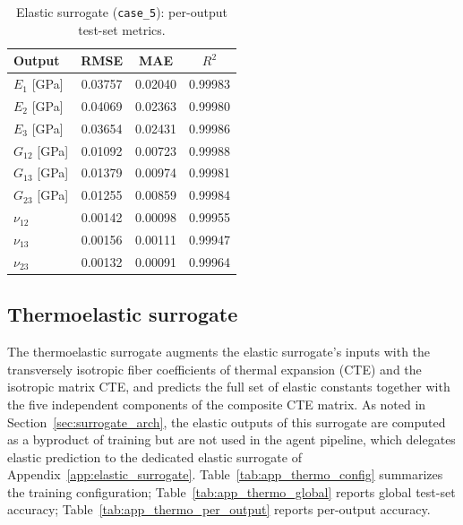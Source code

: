 \documentclass[preprint,review,10pt,number]{elsarticle}
\begin{document}
\begin{table}[h]
\centering
\caption{Elastic surrogate (\texttt{case\_5}): per-output test-set metrics.}
\label{tab:app_elastic_per_output}
\begin{tabular}{lccc}
\toprule
Output & RMSE & MAE & $R^2$ \\
\midrule
$E_1$ [GPa]    & 0.03757 & 0.02040 & 0.99983 \\
$E_2$ [GPa]    & 0.04069 & 0.02363 & 0.99980 \\
$E_3$ [GPa]    & 0.03654 & 0.02431 & 0.99986 \\
$G_{12}$ [GPa] & 0.01092 & 0.00723 & 0.99988 \\
$G_{13}$ [GPa] & 0.01379 & 0.00974 & 0.99981 \\
$G_{23}$ [GPa] & 0.01255 & 0.00859 & 0.99984 \\
$\nu_{12}$     & 0.00142 & 0.00098 & 0.99955 \\
$\nu_{13}$     & 0.00156 & 0.00111 & 0.99947 \\
$\nu_{23}$     & 0.00132 & 0.00091 & 0.99964 \\
\bottomrule
\end{tabular}
\end{table}

\FloatBarrier
\subsection{Thermoelastic surrogate}
\label{app:thermoelastic_surrogate}

The thermoelastic surrogate augments the elastic surrogate's inputs
with the transversely isotropic fiber coefficients of thermal
expansion (CTE) and the isotropic matrix CTE, and predicts the full
set of elastic constants together with the five independent
components of the composite CTE matrix. As noted in
Section~\ref{sec:surrogate_arch}, the elastic outputs of this
surrogate are computed as a byproduct of training but are not used in
the agent pipeline, which delegates elastic prediction to the
dedicated elastic surrogate of Appendix~\ref{app:elastic_surrogate}.
Table~\ref{tab:app_thermo_config} summarizes the training
configuration; Table~\ref{tab:app_thermo_global} reports global
test-set accuracy; Table~\ref{tab:app_thermo_per_output} reports
per-output accuracy.
\end{document}
